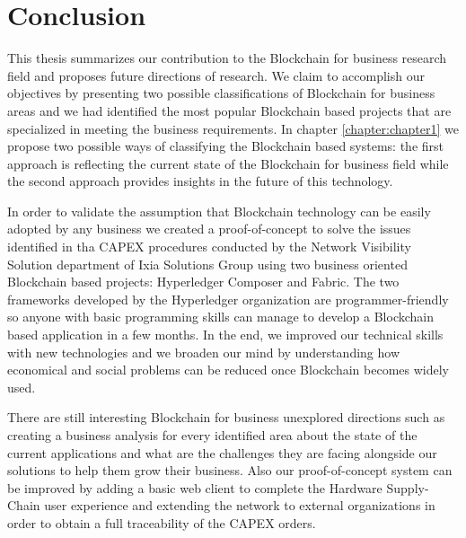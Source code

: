 \chapter{Conclusion}
\label{chapter:conclusion}

This thesis summarizes our contribution to the Blockchain for business research field and proposes future directions of research.
We claim to accomplish our objectives by presenting two possible classifications of Blockchain for business areas and we had identified the most popular Blockchain based projects that are specialized in meeting the business requirements.
In chapter \ref{chapter:chapter1} we propose two possible ways of classifying the Blockchain based systems: the first approach is reflecting the current state of the Blockchain for business field while the second approach provides insights in the future of this technology.

In order to validate the assumption that Blockchain technology can be easily adopted by any business we created a proof-of-concept to solve the issues identified in tha CAPEX procedures conducted by the Network Visibility Solution department of Ixia Solutions Group using two business oriented Blockchain based projects: Hyperledger Composer and Fabric. The two frameworks developed by the Hyperledger organization are programmer-friendly so anyone with basic programming skills can manage to develop a Blockchain based application in a few months. In the end, we improved our technical skills with new technologies and we broaden our mind by understanding how economical and social problems can be reduced once Blockchain becomes widely used.

There are still interesting Blockchain for business unexplored directions such as creating a business analysis for every identified area about the state of the current applications and what are the challenges they are facing alongside our solutions to help them grow their business.
Also our proof-of-concept system can be improved by adding a basic web client to complete the Hardware Supply-Chain user experience and extending the network to external organizations in order to obtain a full traceability of the CAPEX orders.